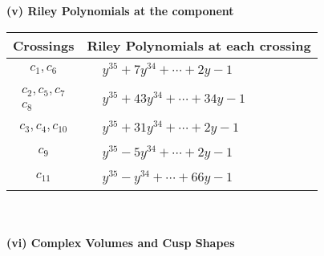 \documentclass[1p]{elsarticle_modified}
\theoremstyle{definition}
\begin{document}
\newpage\renewcommand{\arraystretch}{1}
\flushleft \textbf{(v) Riley Polynomials at the component}\newline \\
\begin{tabular}{m{50pt}|m{274pt}}
Crossings & \hspace{64pt}Riley Polynomials at each crossing \\
\hline $$\begin{aligned}c_{1},c_{6}\end{aligned}$$&$\begin{aligned}
&y^{35}+7 y^{34}+\cdots+2 y-1
\end{aligned}$\\
\hline $$\begin{aligned}c_{2},c_{5},c_{7}\\c_{8}\end{aligned}$$&$\begin{aligned}
&y^{35}+43 y^{34}+\cdots+34 y-1
\end{aligned}$\\
\hline $$\begin{aligned}c_{3},c_{4},c_{10}\end{aligned}$$&$\begin{aligned}
&y^{35}+31 y^{34}+\cdots+2 y-1
\end{aligned}$\\
\hline $$\begin{aligned}c_{9}\end{aligned}$$&$\begin{aligned}
&y^{35}-5 y^{34}+\cdots+2 y-1
\end{aligned}$\\
\hline $$\begin{aligned}c_{11}\end{aligned}$$&$\begin{aligned}
&y^{35}- y^{34}+\cdots+66 y-1
\end{aligned}$\\
\hline
\end{tabular}\\~\\
\newpage\flushleft \textbf{(vi) Complex Volumes and Cusp Shapes}
\end{document}
